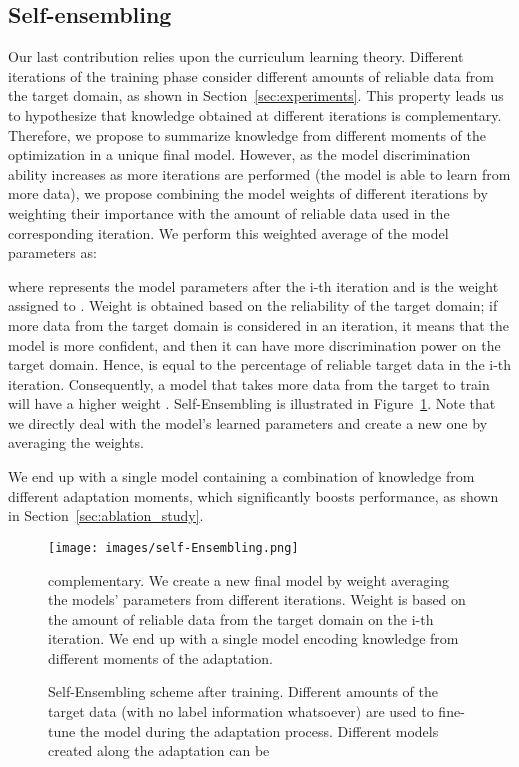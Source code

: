 \documentclass[journal]{IEEEtran}
\begin{document}
\subsection{Self-ensembling}
\label{sec:network_fusion}
 Our last contribution relies upon the curriculum learning theory. Different iterations of the training phase consider different amounts of reliable data from the target domain, as shown in Section~\ref{sec:experiments}. This property leads us to hypothesize that knowledge obtained at different iterations is complementary. Therefore, we propose to summarize knowledge from different moments of the optimization in a unique final model. However, as the model discrimination ability increases as more iterations are performed (the model is able to learn from more data), we propose combining the model weights of different iterations by weighting their importance with the amount of reliable data used in the corresponding iteration. We perform this weighted average of the model parameters as:



\noindent where  represents the model parameters after the i-th iteration and  is the weight assigned to . Weight  is obtained based on the reliability of the target domain; if more data from the target domain is considered in an iteration, it means that the model is more confident, and then it can have more discrimination power on the target domain. Hence,  is equal to the percentage of reliable target data in the i-th iteration. Consequently, a model that takes more data from the target to train will have a higher weight . Self-Ensembling is illustrated in Figure~\ref{fig:network_surgery}. Note that we directly deal with the model's learned parameters and create a new one by averaging the weights.

We end up with a single model containing a combination of knowledge from different adaptation moments, which significantly boosts performance, as shown in Section~\ref{sec:ablation_study}.

\begin{figure}[ht]
\centering
\texttt{[image: images/self-Ensembling.png]}
\caption{Self-Ensembling scheme after training. Different amounts of the target data (with no label information whatsoever) are used to fine-tune the model during the adaptation process. Different models created along the adaptation can be} complementary. We create a new final model by weight averaging the models' parameters from different iterations. Weight  is based on the amount of reliable data from the target domain on the i-th iteration. We end up with a single model encoding knowledge from different moments of the adaptation.
\label{fig:network_surgery}
\end{figure}
\end{document}
